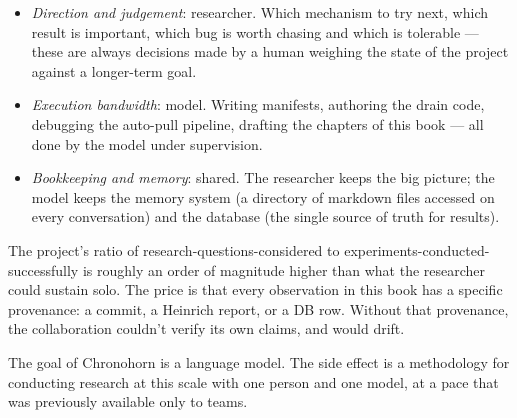 \documentclass[11pt,openany]{book}
\theoremstyle{definition}
\theoremstyle{plain}
\begin{document}
\begin{itemize}
  \item \emph{Direction and judgement}: researcher. Which mechanism to
    try next, which result is important, which bug is worth chasing
    and which is tolerable --- these are always decisions made by a
    human weighing the state of the project against a longer-term
    goal.
  \item \emph{Execution bandwidth}: model. Writing manifests,
    authoring the drain code, debugging the auto-pull pipeline,
    drafting the chapters of this book --- all done by the model
    under supervision.
  \item \emph{Bookkeeping and memory}: shared. The researcher keeps
    the big picture; the model keeps the memory system (a directory
    of markdown files accessed on every conversation) and the
    database (the single source of truth for results).
\end{itemize}

The project's ratio of research-questions-considered to
experiments-conducted-successfully is roughly an order of magnitude
higher than what the researcher could sustain solo. The price is that
every observation in this book has a specific provenance: a commit,
a Heinrich report, or a DB row. Without that provenance, the
collaboration couldn't verify its own claims, and would drift.

The goal of Chronohorn is a language model. The side effect is a
methodology for conducting research at this scale with one person and
one model, at a pace that was previously available only to teams.
\end{document}
